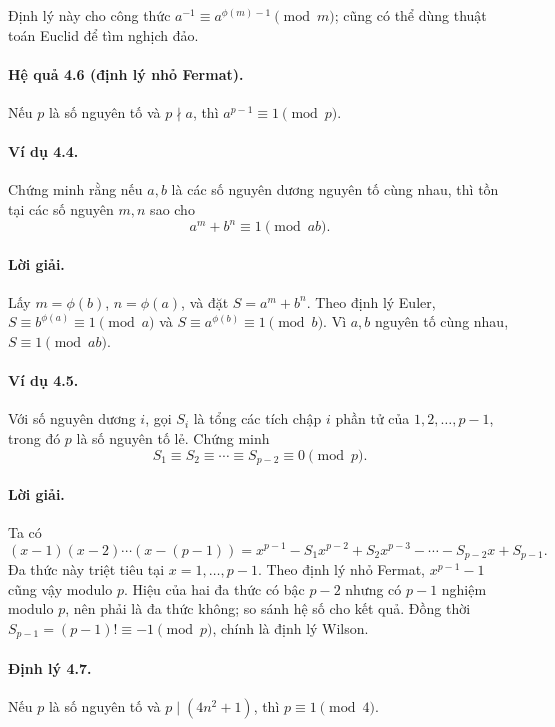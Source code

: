 \documentclass[11pt]{article}
\begin{document}
Định lý này cho công thức \(a^{-1}\equiv a^{\phi(m)-1}\pmod m\); cũng có thể
dùng thuật toán Euclid để tìm nghịch đảo.

\paragraph{Hệ quả 4.6 (định lý nhỏ Fermat).}
Nếu \(p\) là số nguyên tố và \(p\nmid a\), thì \(a^{p-1}\equiv1\pmod p\).

\paragraph{Ví dụ 4.4.}
Chứng minh rằng nếu \(a,b\) là các số nguyên dương nguyên tố cùng nhau, thì tồn
tại các số nguyên \(m,n\) sao cho
\[
 a^m+b^n\equiv1\pmod{ab}.
\]

\paragraph{Lời giải.}
Lấy \(m=\phi(b)\), \(n=\phi(a)\), và đặt \(S=a^m+b^n\). Theo định lý Euler,
\(S\equiv b^{\phi(a)}\equiv1\pmod a\) và \(S\equiv a^{\phi(b)}\equiv1\pmod b\).
Vì \(a,b\) nguyên tố cùng nhau, \(S\equiv1\pmod{ab}\).

\paragraph{Ví dụ 4.5.}
Với số nguyên dương \(i\), gọi \(S_i\) là tổng các tích chập \(i\) phần tử của
\(1,2,\ldots,p-1\), trong đó \(p\) là số nguyên tố lẻ. Chứng minh
\[
 S_1\equiv S_2\equiv\cdots\equiv S_{p-2}\equiv0\pmod p.
\]

\paragraph{Lời giải.}
Ta có
\[
 (x-1)(x-2)\cdots(x-(p-1))
 =x^{p-1}-S_1x^{p-2}+S_2x^{p-3}-\cdots-S_{p-2}x+S_{p-1}.
\]
Đa thức này triệt tiêu tại \(x=1,\ldots,p-1\). Theo định lý nhỏ Fermat,
\(x^{p-1}-1\) cũng vậy modulo \(p\). Hiệu của hai đa thức có bậc \(p-2\) nhưng
có \(p-1\) nghiệm modulo \(p\), nên phải là đa thức không; so sánh hệ số cho
kết quả. Đồng thời \(S_{p-1}=(p-1)!\equiv-1\pmod p\), chính là định lý Wilson.

\paragraph{Định lý 4.7.}
Nếu \(p\) là số nguyên tố và \(p\mid(4n^2+1)\), thì \(p\equiv1\pmod4\).
\end{document}
